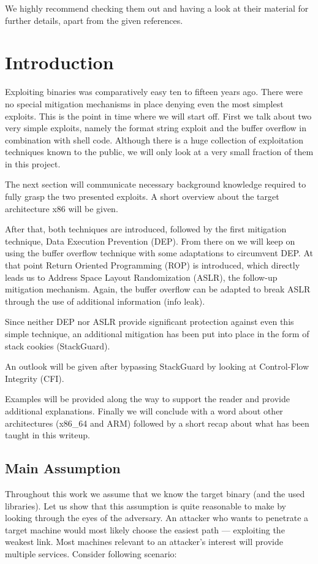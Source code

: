\documentclass[article]{uibk}
\begin{document}
We highly recommend checking them out and having a look at their material for
further details, apart from the given references.

\section{Introduction}

Exploiting binaries was comparatively easy ten to fifteen years ago. There were
no special mitigation mechanisms in place denying even the most simplest
exploits. This is the point in time where we will start off. First we talk
about two very simple exploits, namely the format string exploit and the buffer
overflow in combination with shell code. Although there is a huge collection of
exploitation techniques known to the public, we will only look at a very small
fraction of them in this project.

The next section will communicate necessary background knowledge required to
fully grasp the two presented exploits. A short overview about the target
architecture x86 will be given.

After that, both techniques are introduced, followed by the first mitigation
technique, Data Execution Prevention (DEP). From there on we will keep on using
the buffer overflow technique with some adaptations to circumvent DEP. At that
point Return Oriented Programming (ROP) is introduced, which directly leads us
to Address Space Layout Randomization (ASLR), the follow-up mitigation
mechanism. Again, the buffer overflow can be adapted to break ASLR through the
use of additional information (info leak).

Since neither DEP nor ASLR provide significant protection against even this
simple technique, an additional mitigation has been put into place in the form
of stack cookies (StackGuard).

An outlook will be given after bypassing StackGuard by looking at Control-Flow
Integrity (CFI).

Examples will be provided along the way to support the reader and provide
additional explanations. Finally we will conclude with a word about other
architectures (x86\_64 and ARM) followed by a short recap about what has been
taught in this writeup.

\subsection{Main Assumption}

Throughout this work we assume that we know the target binary (and the used
libraries). Let us show that this assumption is quite reasonable to make by
looking through the eyes of the adversary. An attacker who wants to penetrate a
target machine would most likely choose the easiest path --- exploiting the
weakest link. Most machines relevant to an attacker's interest will provide
multiple services. Consider following scenario:
\end{document}

